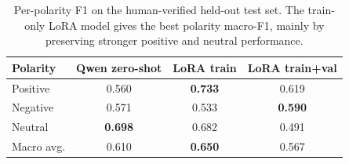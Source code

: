 \begin{table}[t]
\centering
\small
\begin{tabular}{lccc}
\toprule
Polarity & Qwen zero-shot & LoRA train & LoRA train+val \\
\midrule
Positive & 0.560 & \textbf{0.733} & 0.619 \\
Negative & 0.571 & 0.533 & \textbf{0.590} \\
Neutral & \textbf{0.698} & 0.682 & 0.491 \\
\midrule
Macro avg. & 0.610 & \textbf{0.650} & 0.567 \\
\bottomrule
\end{tabular}
\caption{Per-polarity F1 on the human-verified held-out test set. The train-only LoRA model gives the best polarity macro-F1, mainly by preserving stronger positive and neutral performance.}
\label{tab:test_polarity_f1}
\end{table}
